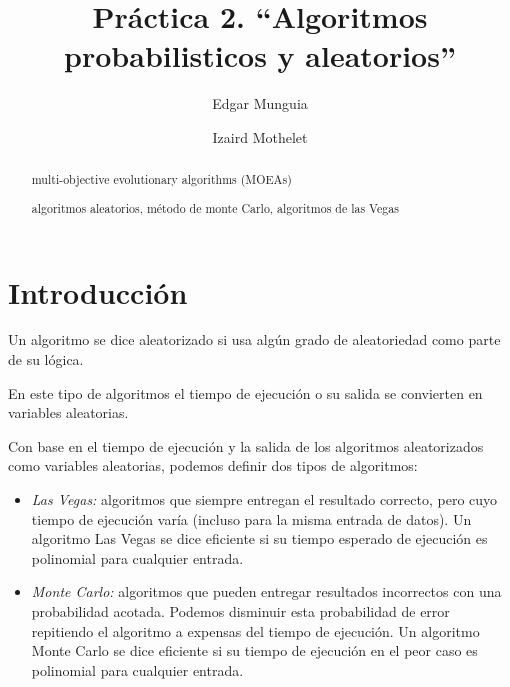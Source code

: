 \documentclass[runningheads,a4paper]{llncs}
\newcommand{\keywords}[1]{\par\addvspace\baselineskip
\noindent\keywordname\enspace\ignorespaces#1}
\begin{document}
\mainmatter

\title{Pr\'actica 2. ``Algoritmos probabilisticos y aleatorios''}



\author{
   Edgar Munguia \and
   Izaird Mothelet
%   
}



\maketitle

\begin{abstract}
multi-objective evolutionary algorithms (MOEAs) 

\keywords{algoritmos aleatorios, m\'etodo de monte Carlo, algoritmos de las Vegas}
          
\end{abstract}


\section{Introducci\'on}
Un algoritmo se dice aleatorizado si usa alg\'un grado de aleatoriedad como parte de su l\'ogica.

En este tipo de algoritmos el tiempo de ejecuci\'on o su salida se convierten en variables aleatorias.

Con base en el tiempo de ejecuci\'on y la salida de los algoritmos aleatorizados 
como variables aleatorias, podemos  definir dos tipos de algoritmos:
\begin{itemize}
\item 	\textit{Las Vegas:} algoritmos que siempre entregan el resultado correcto, pero cuyo tiempo de ejecuci\'on var\'ia (incluso para la misma entrada de datos).
Un algoritmo Las Vegas se dice eficiente si su tiempo esperado de ejecuci\'on es polinomial para cualquier entrada.
\item 	\textit{Monte Carlo:} algoritmos que pueden entregar resultados incorrectos con una probabilidad acotada.
Podemos disminuir esta probabilidad de error repitiendo el algoritmo a expensas del tiempo de ejecuci\'on.
Un algoritmo Monte Carlo se dice eficiente si su tiempo de ejecuci\'on en el peor caso es polinomial para cualquier entrada.
\end{itemize}
\end{document}
